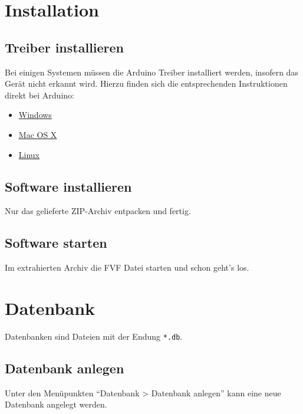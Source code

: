 \documentclass[11pt,accentcolor=tud2a,colorback,noheadingspace,bigchapter]{tudreport}
\begin{document}
\chapter{Installation}
\label{installation:installation}
\label{installation::doc}

\section{Treiber installieren}
\label{installation:treiber-installieren}
Bei einigen Systemen müssen die Arduino Treiber installiert werden, insofern 
das Gerät nicht erkannt wird. Hierzu finden sich die entsprechenden Instruktionen 
direkt bei Arduino:

\begin{itemize}
\item {} 
\href{http://www.arduino.cc/en/Guide/Windows}{Windows}

\item {} 
\href{http://www.arduino.cc/en/Guide/MacOSX}{Mac OS X}

\item {} 
\href{http://www.arduino.cc/playground/Learning/Linux}{Linux}

\end{itemize}


\section{Software installieren}
\label{installation:software-installieren}\label{installation:linux}
Nur das gelieferte ZIP-Archiv entpacken und fertig.


\section{Software starten}
\label{installation:software-starten}
Im extrahierten Archiv die FVF Datei starten und schon geht's los.


\chapter{Datenbank}
\label{database:datenbank}\label{database::doc}
Datenbanken sind Dateien mit der Endung \texttt{*.db}.


\section{Datenbank anlegen}
\label{database:datenbank-anlegen}
Unter den Menüpunkten ``Datenbank \textgreater{} Datenbank anlegen'' 
kann eine neue Datenbank angelegt werden.
\end{document}
